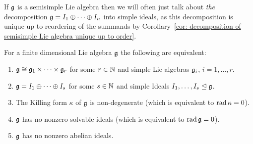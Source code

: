 \begin{remark}
 If $\mathfrak{g}$ is a semisimple Lie algebra then we will often just talk about \emph{the} decomposition $\mathfrak{g} = I_1 \oplus \dotsb \oplus I_n$ into simple ideals, as this decomposition is unique up to reordering of the summands by Corollary~\ref{cor: decomposition of semisimple Lie algebra unique up to order}.
\end{remark}


\begin{theorem}\label{thrm: characterisations of finite-dimensional semisimple Lie algebras}
 For a finite dimensional Lie algebra $\mathfrak{g}$ the following are equivalent:
 \begin{enumerate}[leftmargin=*]
  \item\label{enum: definition semisimple Lie algebra product of simple Lie algebras}
   $\mathfrak{g} \cong \mathfrak{g}_1 \times \dotsb \times \mathfrak{g}_r$ for some $r \in \mathbb{N}$ and simple Lie algebras $\mathfrak{g}_i$, $i = 1, \dotsc, r$.
  \item\label{enum: definition semisimple Lie algebra sum of simple ideals}
   $\mathfrak{g} = I_1 \oplus \dotsb \oplus I_s$ for some $s \in \mathbb{N}$ and simple Ideals $I_1, \dotsc, I_s \trianglelefteq \mathfrak{g}$.
  \item\label{enum: definition semisimple Lie algebra killing form nondegenerate}
   The Killing form $\kappa$ of $\mathfrak{g}$ is non-degenerate (which is equivalent to $\operatorname{rad} \kappa = 0$).
  \item\label{enum: definition semisimple Lie algebra radical is zero}
   $\mathfrak{g}$ has no nonzero solvable ideals (which is equivalent to $\operatorname{rad} \mathfrak{g} = 0$).
  \item\label{enum: definition semisimple Lie algebra no nonzero abelian ideals}
   $\mathfrak{g}$ has no nonzero abelian ideals.
 \end{enumerate}
\end{theorem}
